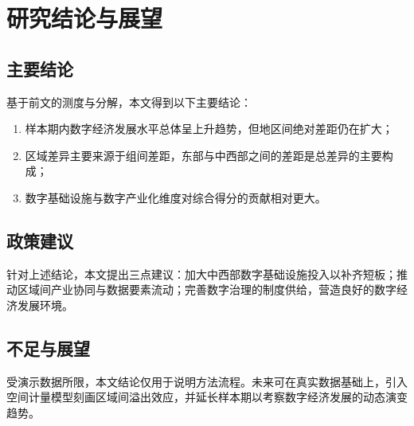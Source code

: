\chapter{研究结论与展望}
\label{chap:conclusion}

\section{主要结论}

基于前文的测度与分解，本文得到以下主要结论：

\begin{enumerate}[label=（\arabic*）]
    \item 样本期内数字经济发展水平总体呈上升趋势，但地区间绝对差距仍在扩大；
    \item 区域差异主要来源于组间差距，东部与中西部之间的差距是总差异的主要构成；
    \item 数字基础设施与数字产业化维度对综合得分的贡献相对更大。
\end{enumerate}

\section{政策建议}

针对上述结论，本文提出三点建议：加大中西部数字基础设施投入以补齐短板；推动区域间产业协同与数据要素流动；完善数字治理的制度供给，营造良好的数字经济发展环境。

\section{不足与展望}

受演示数据所限，本文结论仅用于说明方法流程。未来可在真实数据基础上，引入空间计量模型刻画区域间溢出效应，并延长样本期以考察数字经济发展的动态演变趋势。
